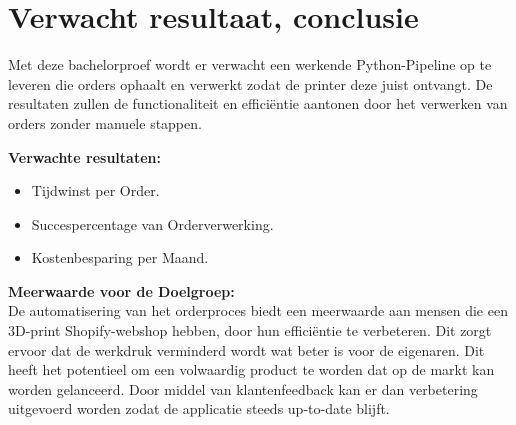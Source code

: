 



\section{Verwacht resultaat, conclusie}%
\label{sec:verwachte_resultaten}

Met deze bachelorproef wordt er verwacht een werkende Python-Pipeline op te leveren die orders ophaalt en verwerkt zodat de printer deze juist ontvangt. De resultaten zullen de functionaliteit en efficiëntie aantonen door het verwerken van orders zonder manuele stappen.

\vspace{1em}
\textbf{Verwachte resultaten:}
\begin{itemize}
\item Tijdwinst per Order.
\item Succespercentage van Orderverwerking.
\item Kostenbesparing per Maand.
\end{itemize}

\textbf{Meerwaarde voor de Doelgroep:}\\

De automatisering van het orderproces biedt een meerwaarde aan mensen die een 3D-print Shopify-webshop hebben, door hun efficiëntie te verbeteren. Dit zorgt ervoor dat de werkdruk verminderd wordt wat beter is voor de eigenaren. Dit heeft het potentieel om een volwaardig product te worden dat op de markt kan worden gelanceerd. Door middel van klantenfeedback kan er dan verbetering uitgevoerd worden zodat de applicatie steeds up-to-date blijft.


